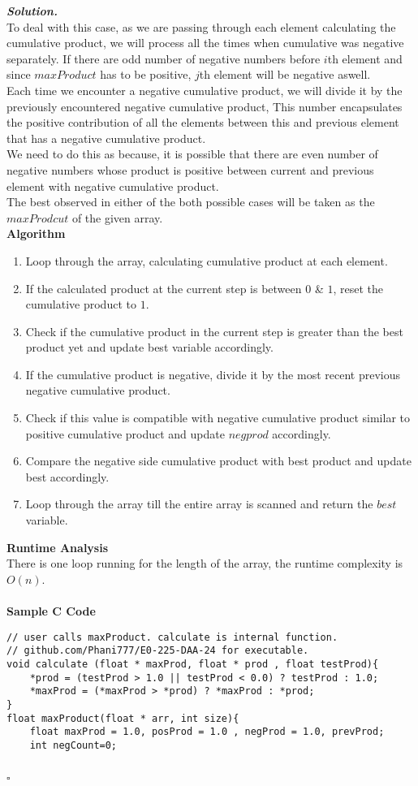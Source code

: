 \documentclass[12pt]{article}
\newenvironment{solution}[1][\it{Solution}]{\textbf{#1. } }{$\square$}
\begin{document}
\begin{solution}
\\\indent To deal with this case, as we are passing through each element calculating the cumulative product, we will process all the times when cumulative was negative separately. If there are odd number of negative numbers before $i$th element and since $maxProduct$ has to be positive, $j$th element will be negative aswell. 
\\ \indent Each time we encounter a negative cumulative product, we will divide it by the previously encountered negative cumulative product, This number encapsulates the positive contribution of all the elements between this and previous element that has a negative cumulative product. 
\\ \indent We need to do this as because, it is possible that there are even number of negative numbers whose product is positive between current and previous element with negative cumulative product.
\\ \indent The best observed in either of the both possible cases will be taken as the $maxProdcut$ of the given array.  
\\  \textbf{Algorithm} 
\begin{enumerate}
    \item Loop through the array, calculating cumulative product at each element. 
    \item If the calculated product at the current step is between $0$ \& $1$, reset the cumulative product to $1$.
    \item Check if the cumulative product in the current step is greater than the best product yet and update best variable accordingly.
    \item  If the cumulative product is negative, divide it by the most recent previous negative cumulative product. 
    \item Check if this value is compatible with negative cumulative product similar to positive cumulative product and update $negprod$ accordingly. 
    \item Compare the negative side cumulative product with best product and update best accordingly. 
    \item Loop through the array till the entire array is scanned and return the $best$ variable. 
\end{enumerate} 
\textbf{Runtime Analysis} \\
\indent There is one loop running for the length of the array, the runtime complexity is $O(n)$. \\ \\
 \textbf{Sample C Code}
\begin{verbatim}
// user calls maxProduct. calculate is internal function.
// github.com/Phani777/E0-225-DAA-24 for executable.
void calculate (float * maxProd, float * prod , float testProd){
    *prod = (testProd > 1.0 || testProd < 0.0) ? testProd : 1.0;
    *maxProd = (*maxProd > *prod) ? *maxProd : *prod;
}
float maxProduct(float * arr, int size){
    float maxProd = 1.0, posProd = 1.0 , negProd = 1.0, prevProd;
    int negCount=0;


\end{verbatim}
\end{solution}
\end{document}
